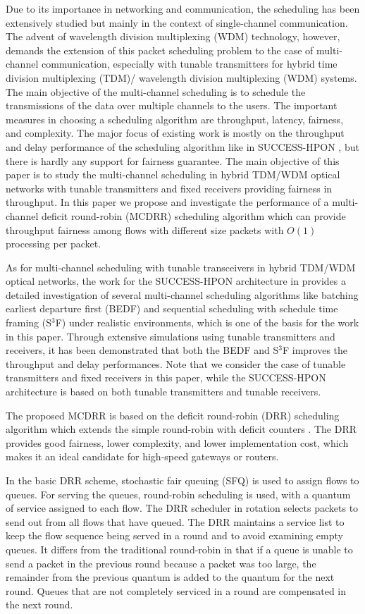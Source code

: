 \documentclass[conference,letterpaper]{IEEEtran}
\begin{document}
Due to its importance in networking and communication, the scheduling has been
extensively studied but mainly in the context of single-channel
communication. The advent of wavelength division multiplexing (WDM) technology,
however, demands the extension of this packet scheduling problem to the case of
multi-channel communication, especially with tunable transmitters for hybrid
time division multiplexing (TDM)/ wavelength division multiplexing (WDM) systems. 
The main objective of the multi-channel scheduling is to schedule the transmissions 
of the data over multiple channels to the users. The important measures in choosing a scheduling
algorithm are throughput, latency, fairness, and complexity. The major focus of
existing work is mostly on the throughput and delay performance of the
scheduling algorithm like in SUCCESS-HPON \cite{Kim:05-1}, but there is hardly
any support for fairness guarantee. The main objective of this paper is to study
the multi-channel scheduling in hybrid TDM/WDM optical networks with tunable
transmitters and fixed receivers providing fairness in throughput. In this paper
we propose and investigate the performance of a multi-channel deficit
round-robin (MCDRR) scheduling algorithm which can provide throughput fairness
among flows with different size packets with $O(1)$ processing per packet.

As for multi-channel scheduling with tunable transceivers in hybrid TDM/WDM
optical networks, the work for the SUCCESS-HPON architecture in \cite{Kim:05-1}
provides a detailed investigation of several multi-channel scheduling algorithms
like batching earliest departure first (BEDF) and sequential scheduling with
schedule time framing (S$^3$F) under realistic environments, which is one of the
basis for the work in this paper. Through extensive simulations using tunable
transmitters and receivers, it has been demonstrated that both the BEDF and
S$^3$F improves the throughput and delay performances. Note that we consider the
case of tunable transmitters and fixed receivers in this paper, while the
SUCCESS-HPON architecture is based on both tunable transmitters and tunable
receivers.

The proposed MCDRR is based on the deficit round-robin (DRR) scheduling
algorithm which extends the simple round-robin with deficit counters
\cite{Shreedhar:95-1}. The DRR provides good fairness, lower complexity, and
lower implementation cost, which makes it an ideal candidate for high-speed
gateways or routers.

In the basic DRR scheme, stochastic fair queuing (SFQ) \cite{mckenney91:_stoch}
is used to assign flows to queues. For serving the queues, round-robin
scheduling is used, with a quantum of service assigned to each flow. The DRR
scheduler in rotation selects packets to send out from all flows that have
queued. The DRR maintains a service list to keep the flow sequence being served
in a round and to avoid examining empty queues. It differs from the traditional
round-robin in that if a queue is unable to send a packet in the previous round
because a packet was too large, the remainder from the previous quantum is added
to the quantum for the next round. Queues that are not completely serviced in a
round are compensated in the next round.
\end{document}
